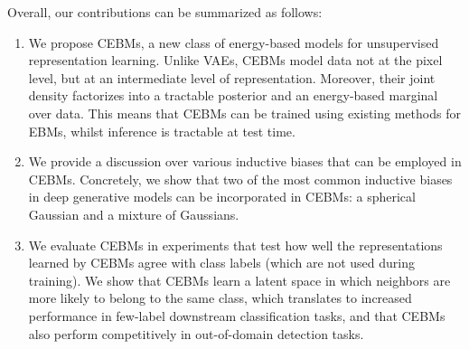 \documentclass{article}
\begin{document}
Overall, our contributions can be summarized as follows:
\begin{enumerate}[noitemsep,topsep=0pt,parsep=6pt,partopsep=0pt]
    \item We propose CEBMs, a new class of energy-based models for unsupervised representation learning. Unlike VAEs, CEBMs model data not at the pixel level, but at an intermediate level of representation. Moreover, their joint density factorizes into a tractable posterior and an energy-based marginal over data. This means that CEBMs can be trained using existing methods for EBMs, whilst inference is tractable at test time. 
    \item We provide a discussion over various inductive biases that can be employed in CEBMs. Concretely, we show that two of the most common inductive biases in deep generative models can be incorporated in CEBMs: a spherical Gaussian and a mixture of Gaussians. 
    \item We evaluate CEBMs in experiments that test how well the representations learned by CEBMs agree with class labels (which are not used during training). We show that CEBMs learn a latent space in which neighbors are more likely to belong to the same class, which translates to increased performance in few-label downstream classification tasks, and that CEBMs also perform competitively in out-of-domain detection tasks.
\end{enumerate}







\end{document}
